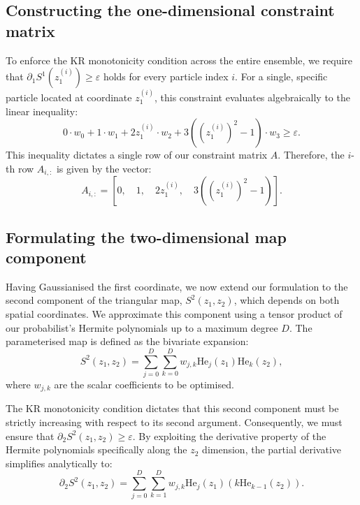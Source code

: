 \subsection{Constructing the one-dimensional constraint matrix}

To enforce the KR monotonicity condition across the entire ensemble, we require that $\partial_1 S^1(z_1^{(i)}) \ge \varepsilon$ holds for every particle index $i$. For a single, specific particle located at coordinate $z_1^{(i)}$, this constraint evaluates algebraically to the linear inequality:
\begin{equation*}
    0 \cdot w_0 + 1 \cdot w_1 + 2z_1^{(i)} \cdot w_2 + 3\left((z_1^{(i)})^2 - 1\right) \cdot w_3 \ge \varepsilon.
\end{equation*}
This inequality dictates a single row of our constraint matrix ${A}$. Therefore, the $i$-th row ${A}_{i,:}$ is given by the vector:
\begin{equation*}
    {A}_{i,:} = \left[ 0, \quad 1, \quad 2z_1^{(i)}, \quad 3\left((z_1^{(i)})^2 - 1\right) \right].
\end{equation*}

\subsection{Formulating the two-dimensional map component}

Having Gaussianised the first coordinate, we now extend our formulation to the second component of the triangular map, $S^2(z_1, z_2)$, which depends on both spatial coordinates. We approximate this component using a tensor product of our probabilist's Hermite polynomials up to a maximum degree $D$. The parameterised map is defined as the bivariate expansion:
\begin{equation*}
    S^2(z_1, z_2) = \sum_{j=0}^D \sum_{k=0}^D w_{j,k} \text{He}_j(z_1) \text{He}_k(z_2),
\end{equation*}
where $w_{j,k}$ are the scalar coefficients to be optimised. 

The KR monotonicity condition dictates that this second component must be strictly increasing with respect to its second argument. Consequently, we must ensure that $\partial_2 S^2(z_1, z_2) \ge \varepsilon$. By exploiting the derivative property of the Hermite polynomials specifically along the $z_2$ dimension, the partial derivative simplifies analytically to:
\begin{equation*}
    \partial_2 S^2(z_1, z_2) = \sum_{j=0}^D \sum_{k=1}^D w_{j,k} \text{He}_j(z_1) \left( k \text{He}_{k-1}(z_2) \right).
\end{equation*}

